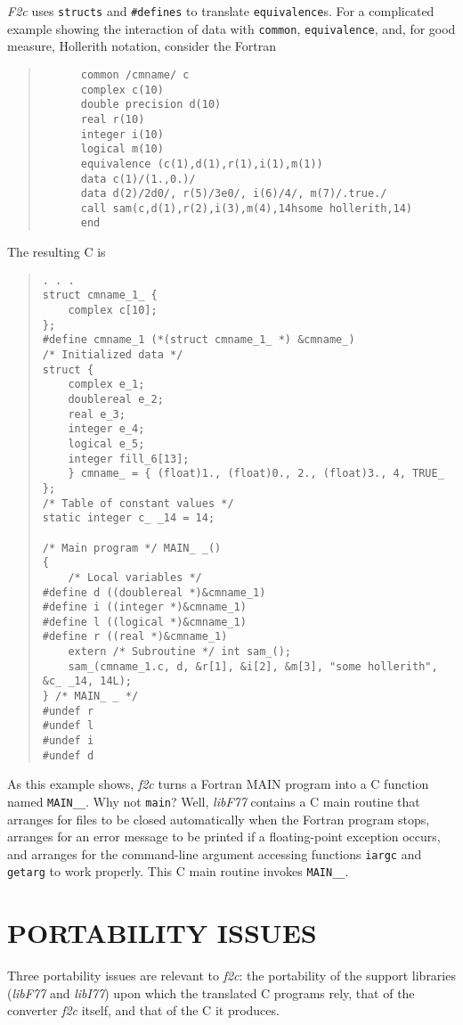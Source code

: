 \documentclass[12pt]{article}
\begin{document}
\emph{F2c} uses \verb|structs| and \verb|#defines| to translate \verb|equivalence|s. For a complicated example showing the interaction of data with \verb|common|, \verb|equivalence|, and, for good measure, Hollerith notation, consider the Fortran
\begin{quote}
\begin{verbatim}
      common /cmname/ c
      complex c(10)
      double precision d(10)
      real r(10)
      integer i(10)
      logical m(10)
      equivalence (c(1),d(1),r(1),i(1),m(1))
      data c(1)/(1.,0.)/
      data d(2)/2d0/, r(5)/3e0/, i(6)/4/, m(7)/.true./
      call sam(c,d(1),r(2),i(3),m(4),14hsome hollerith,14)
      end
\end{verbatim}
\end{quote}
The resulting C is
\begin{quote}
\begin{verbatim}
. . .
struct cmname_1_ {
    complex c[10];
};
#define cmname_1 (*(struct cmname_1_ *) &cmname_)
/* Initialized data */
struct {
    complex e_1;
    doublereal e_2;
    real e_3;
    integer e_4;
    logical e_5;
    integer fill_6[13];
    } cmname_ = { (float)1., (float)0., 2., (float)3., 4, TRUE_ };
/* Table of constant values */
static integer c_ _14 = 14;

/* Main program */ MAIN_ _()
{
    /* Local variables */
#define d ((doublereal *)&cmname_1)
#define i ((integer *)&cmname_1)
#define l ((logical *)&cmname_1)
#define r ((real *)&cmname_1)
    extern /* Subroutine */ int sam_();
    sam_(cmname_1.c, d, &r[1], &i[2], &m[3], "some hollerith", &c_ _14, 14L);
} /* MAIN_ _ */
#undef r
#undef l
#undef i
#undef d
\end{verbatim}
\end{quote}
As this example shows, \emph{f2c} turns a Fortran MAIN program into a C function named \verb|MAIN__|. Why not \verb|main|? Well, \emph{libF77} contains a C main routine that arranges for files to be closed automatically when the Fortran program stops, arranges for an error message to be printed if a floating-point exception occurs, and arranges for the command-line argument accessing functions \verb|iargc| and \verb|getarg| to work properly. This C main routine invokes \verb|MAIN__|.

\section{PORTABILITY ISSUES}

Three portability issues are relevant to \emph{f2c}: the portability of the support libraries (\emph{libF77} and \emph{libI77}) upon which the translated C programs rely, that of the converter \emph{f2c} itself, and that of the C it produces.
\end{document}

